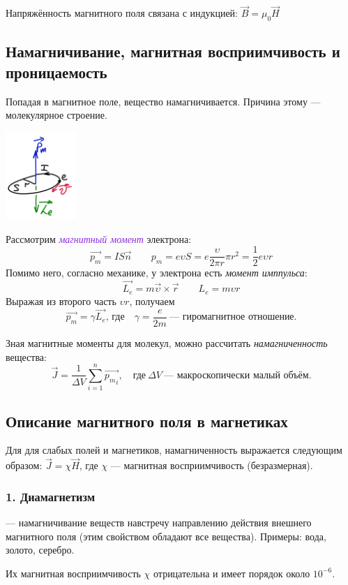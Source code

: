 \documentclass[12pt]{report}
\begin{document}
Напряжённость магнитного поля связана с индукцией: $\vec{B} = \mu_0\vec{H}$
\subsection*{Намагничивание, магнитная восприимчивость и проницаемость}
Попадая в магнитное поле, вещество намагничивается.
Причина этому --- молекулярное строение.
\begin{center}
    \includegraphics[width=0.2\textwidth]{graphics/22_1.png}
\end{center}
Рассмотрим \textit{\textcolor{BlueViolet}{магнитный момент}} электрона:
\[\vec{p_m} = IS\vec{n} \qquad p_m = e \upsilon S = e \frac{\upsilon}{2\pi r}\pi r^2 =
    \frac{1}{2}e\upsilon r \]
Помимо него, согласно механике, у электрона есть
\textit{\textcolor{OliveGreen}{момент имппульса}}:
\[\vec{L_e} = m\vec{\upsilon}\times\vec{r} \qquad L_e = m\upsilon r\]
Выражая из второго часть $\upsilon r$, получаем
\[ \vec{p_m} = \gamma\vec{L_e} \textrm{, где} \quad \gamma = \frac{e}{2m} \
    \textrm{--- гиромагнитное отношение.} \]

Зная магнитные моменты для молекул, можно рассчитать \textit{намагниченность} вещества:
\[\vec{J} = \frac{1}{\varDelta V} \sum_{i=1}^{n}\overrightarrow{{p_m}_i},
    \quad \textrm{где} \ \varDelta V \ \textrm{--- макроскопически малый объём.}\]
\subsection*{Описание магнитного поля в магнетиках}
Для для слабых полей и магнетиков, намагниченность выражается следующим образом:
$\vec{J} = \chi\vec{H}$, где $\chi$ --- магнитная восприимчивость (безразмерная).
\subsubsection*{1. Диамагнетизм}
--- намагничивание веществ навстречу направлению действия внешнего магнитного поля
(этим свойством обладают все вещества). Примеры: вода, золото, серебро.

Их магнитная восприимчивость $\chi$ отрицательна и имеет порядок около $10^{-6}$.
\end{document}
